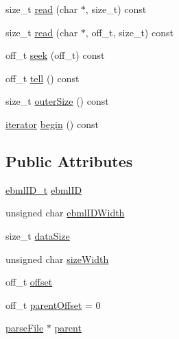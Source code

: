 \begin{DoxyCompactItemize}
\item 
size\+\_\+t \mbox{\hyperlink{classebml_1_1parseFile_a7990c780ffcea11f4091d8e72f8c82a2}{read}} (char $\ast$, size\+\_\+t) const
\item 
size\+\_\+t \mbox{\hyperlink{classebml_1_1parseFile_adf66ffa2232190fd80d571234101168d}{read}} (char $\ast$, off\+\_\+t, size\+\_\+t) const
\item 
off\+\_\+t \mbox{\hyperlink{classebml_1_1parseFile_afadebe20ce8552072386aa274063026c}{seek}} (off\+\_\+t) const
\item 
off\+\_\+t \mbox{\hyperlink{classebml_1_1parseFile_a81ef81127bb4b467e56d5866ce834acd}{tell}} () const
\item 
size\+\_\+t \mbox{\hyperlink{classebml_1_1parseFile_ac156b7959ace5c0ef511fd561dd5aa7e}{outer\+Size}} () const
\item 
\mbox{\hyperlink{classebml_1_1parseFile_1_1iterator}{iterator}} \mbox{\hyperlink{classebml_1_1parseFile_aaa18341bf2735f25e4302f38dbd51748}{begin}} () const
\end{DoxyCompactItemize}
\subsection*{Public Attributes}
\begin{DoxyCompactItemize}
\item 
\mbox{\hyperlink{namespaceebml_a86c5f604ddf12a74aa9812e997a58691}{ebml\+I\+D\+\_\+t}} \mbox{\hyperlink{classebml_1_1parseFile_ae05c961961bd5c0ab9e5d027a4152df1}{ebml\+ID}}
\item 
unsigned char \mbox{\hyperlink{classebml_1_1parseFile_a0ff076fb9e1326d33c1d548b5d64f61d}{ebml\+I\+D\+Width}}
\item 
size\+\_\+t \mbox{\hyperlink{classebml_1_1parseFile_a313a39468cbc316035721c0198168e02}{data\+Size}}
\item 
unsigned char \mbox{\hyperlink{classebml_1_1parseFile_ad13d3f7ac6cc6119754bda17260657fd}{size\+Width}}
\item 
off\+\_\+t \mbox{\hyperlink{classebml_1_1parseFile_ab24f05f852f306ce6ea5b1be02cc8476}{offset}}
\item 
off\+\_\+t \mbox{\hyperlink{classebml_1_1parseFile_ade25134b3a295d7aa376974c766911cb}{parent\+Offset}} = 0
\item 
\mbox{\hyperlink{classebml_1_1parseFile}{parse\+File}} $\ast$ \mbox{\hyperlink{classebml_1_1parseFile_a00df584c2edbd4ca1cd0a3e9082f9004}{parent}}
\end{DoxyCompactItemize}
